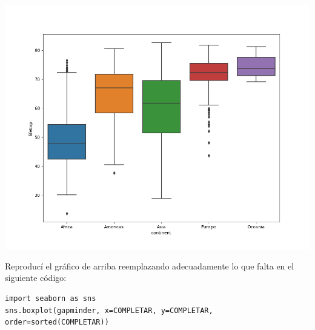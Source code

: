 \documentclass[a4paper,11pt]{article}
\theoremstyle{definition}
\begin{document}
\begin{enumerate}[resume]
\begin{center}
\includegraphics[scale=0.6]{practica3-img-gapminder-boxplot.png}
\end{center}

Reproduc\'i el gr\'afico de arriba reemplazando adecuadamente lo que falta en el siguiente c\'odigo:
\begin{lstlisting}
import seaborn as sns
sns.boxplot(gapminder, x=COMPLETAR, y=COMPLETAR, order=sorted(COMPLETAR))
\end{lstlisting}

\end{enumerate}
\end{document}
